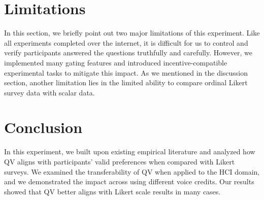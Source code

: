 \section{Limitations} \label{future}
In this section, we briefly point out two major limitations of this experiment. Like all experiments completed over the internet, it is difficult for us to control and verify participants answered the questions truthfully and carefully. However, we implemented many gating features and introduced incentive-compatible experimental tasks to mitigate this impact. As we mentioned in the discussion section, another limitation lies in the limited ability to compare ordinal Likert survey data with scalar data.


\section{Conclusion} \label{conclusion}
In this experiment, we built upon existing empirical literature and analyzed how QV aligns with participants' valid preferences when compared with Likert surveys. We examined the transferability of QV when applied to the HCI domain, and we demonstrated the impact across using different voice credits. Our results showed that QV better aligns with Likert scale results in many cases.






